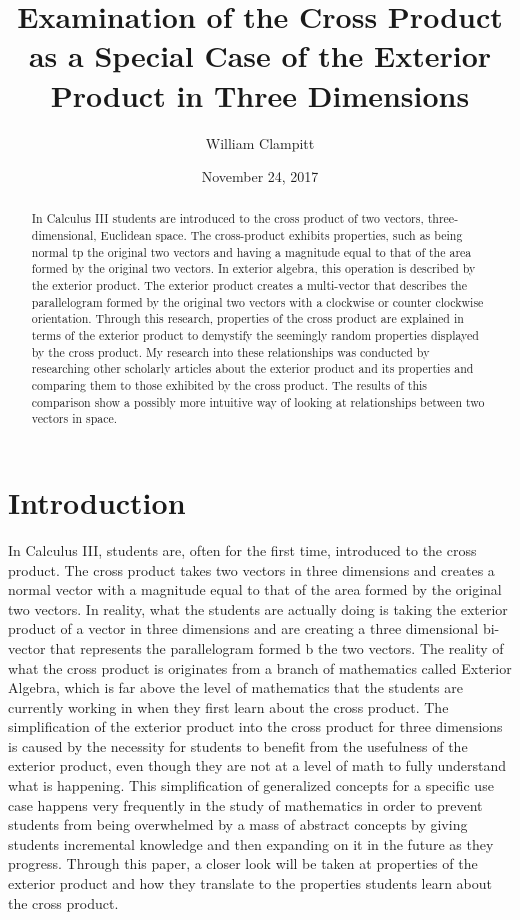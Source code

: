 \documentclass{amsart}
\title
[Examination of the Cross Product] %
{Examination of the Cross Product as a Special Case of the Exterior Product in Three Dimensions}
\author{William Clampitt}
\date{November 24, 2017}
\begin{document}
	
	\begin{abstract}
		In Calculus III students are introduced to the cross product of two vectors, three-dimensional, Euclidean space. The cross-product exhibits properties, such as being normal tp the original two vectors and having a magnitude equal to that of the area formed by the original two vectors. In exterior algebra, this operation is described by the exterior product. The exterior product creates a multi-vector that describes the parallelogram formed by the original two vectors with a clockwise or counter clockwise orientation. Through this research, properties of the cross product are explained in terms of the exterior product to demystify the seemingly random properties displayed by the cross product. My research into these relationships was conducted by researching other scholarly articles about the exterior product and its properties and comparing them to those exhibited by the cross product. The results of this comparison show a possibly more intuitive way of looking at relationships between two vectors in space.
	\end{abstract}

	\maketitle
	\newpage
	
	\section{Introduction} \label{intro}
		In Calculus III, students are, often for the first time, introduced to the cross product. The cross product takes two vectors in three dimensions and creates a normal vector with a magnitude equal to that of the area formed by the original two vectors. In reality, what the students are actually doing is taking the exterior product of a vector in three dimensions and are creating a three dimensional bi-vector that represents the parallelogram formed b the two vectors. The reality of what the cross product is originates from a branch of mathematics called Exterior Algebra, which is far above the level of mathematics that the students are currently working in when they first learn about the cross product. The simplification of the exterior product into the cross product for three dimensions is caused by the necessity for students to benefit from the usefulness of the exterior product, even though they are not at a level of math to fully understand what is happening. This simplification of generalized concepts for a specific use case happens very frequently in the study of mathematics in order to prevent students from being overwhelmed by a mass of abstract concepts by giving students incremental knowledge and then expanding on it in the future as they progress. Through this paper, a closer look will be taken at properties of the exterior product and how they translate to the properties students learn about the cross product.
		
\end{document}
